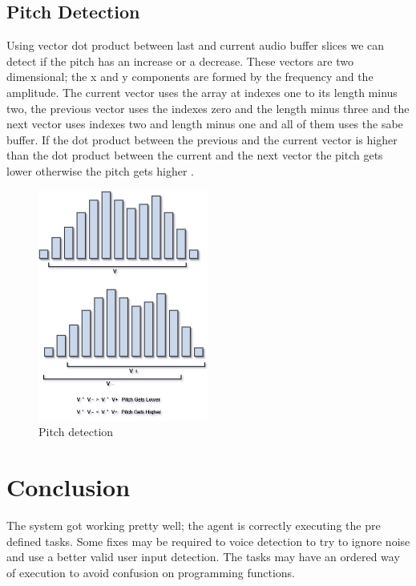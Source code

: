 \documentclass[
	article,			%
	11pt,				%
	oneside,			%
	a4paper,			%
	english,			%
	english,				%
	]{abntex2}
\begin{document}
\subsection{Pitch Detection}

Using vector dot product between last and current audio buffer slices we can detect if the pitch has
an increase or a decrease. These vectors are two dimensional; the x and y components are formed by
the frequency and the amplitude. The current vector uses the array at indexes one to its length
minus two, the previous vector uses the indexes zero and the length minus three and the next vector 
uses indexes two and length minus one and all of them uses the sabe buffer. If the dot product between 
the previous and the current vector is higher than the dot product between the current and the next
vector the pitch gets lower otherwise the pitch gets higher \cite{nonverbalvoiceinput}.

\begin{figure}[H]
    \caption[english]{Pitch detection}
    \centering
    \includegraphics[width=0.5\textwidth]{PitchDetection}
\end{figure}

\section{Conclusion}

The system got working pretty well; the agent is correctly executing the pre defined tasks.
Some fixes may be required to voice detection to try to ignore noise and use a better valid
user input detection. The tasks may have an ordered way of execution to avoid confusion on
programming functions.
\end{document}
